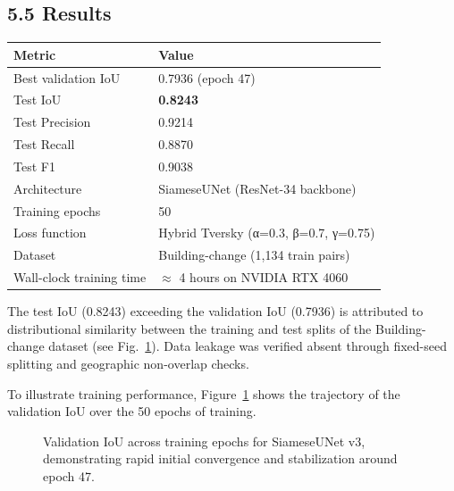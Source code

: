\documentclass[11pt,a4paper]{article}
\begin{document}
\hypertarget{results}{%
\subsection{5.5 Results}\label{results}}

\begin{longtable}[]{@{}ll@{}}
\toprule\noalign{}
Metric & Value \\
\midrule\noalign{}
\endhead
\bottomrule\noalign{}
\endlastfoot
Best validation IoU & 0.7936 (epoch 47) \\
Test IoU & \textbf{0.8243} \\
Test Precision & 0.9214 \\
Test Recall & 0.8870 \\
Test F1 & 0.9038 \\
Architecture & SiameseUNet (ResNet-34 backbone) \\
Training epochs & 50 \\
Loss function & Hybrid Tversky (α=0.3, β=0.7, γ=0.75) \\
Dataset & Building-change (1,134 train pairs) \\
Wall-clock training time & $\approx$ 4 hours on NVIDIA RTX 4060 \\
\end{longtable}

The test IoU (0.8243) exceeding the validation IoU (0.7936) is attributed to distributional similarity between the training and test splits of the Building-change dataset (see Fig.~\ref{fig:cd-iou-curve}). Data leakage was verified absent through fixed-seed splitting and geographic non-overlap checks.

To illustrate training performance, Figure~\ref{fig:cd-iou-curve} shows the trajectory of the validation IoU over the 50 epochs of training.

\begin{figure}[htbp]
\centering
{}
\caption{Validation IoU across training epochs for SiameseUNet v3, demonstrating rapid initial convergence and stabilization around epoch 47.}
\label{fig:cd-iou-curve}
\end{figure}
\end{document}
